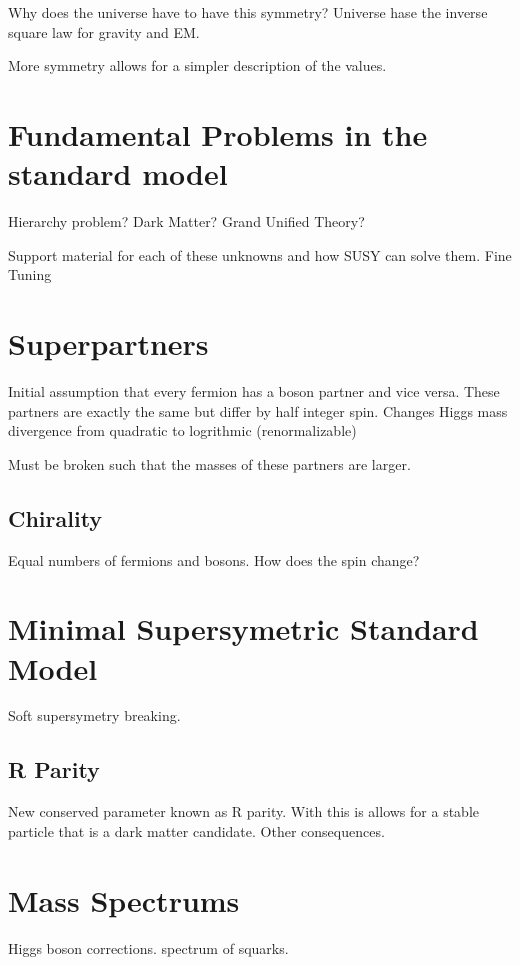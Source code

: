 Why does the universe have to have this symmetry?
Universe hase the inverse square law for gravity and EM.

More symmetry allows for a simpler description of the values. 

\section{Fundamental Problems in the standard model}
\label{sec:Hierarchy}

Hierarchy problem?
Dark Matter?
Grand Unified Theory?

Support material for each of these unknowns and how SUSY can solve them. Fine Tuning

\section{Superpartners}
\label{sec:superpartners}

Initial assumption that every fermion has a boson partner and vice versa. These partners are exactly the same but differ by half integer spin. Changes Higgs mass divergence from quadratic to logrithmic (renormalizable)

Must be broken such that the masses of these partners are larger.

\subsection{Chirality}
\label{subsec:chiral}

Equal numbers of fermions and bosons. How does the spin change? 

\section{Minimal Supersymetric Standard Model}
\label{sec:MSSM}

Soft supersymetry breaking. 

\subsection{R Parity}
\label{subsec:rparity}

New conserved parameter known as R parity. With this is allows for a stable particle that is a dark matter candidate. Other consequences.

\section{Mass Spectrums}

Higgs boson corrections. spectrum of squarks. 






